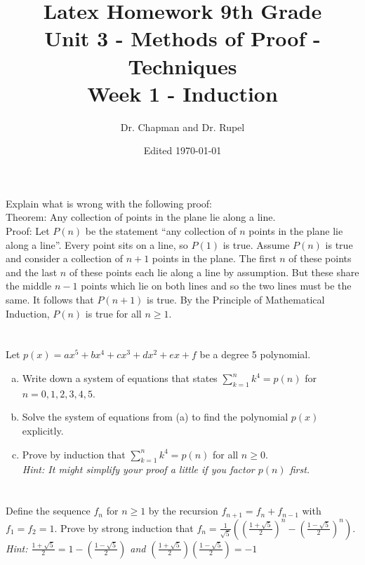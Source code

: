 \documentclass{article}
\title{Latex Homework 9th Grade\\ Unit 3 - Methods of Proof - Techniques \\ Week 1 - Induction}
\author{Dr. Chapman and Dr. Rupel}
\date{Edited \today}
\begin{document}
\maketitle

\section{}
    Explain what is wrong with the following proof:\\
    
    \noindent Theorem: Any collection of points in the plane lie along a line.\\
    
    \noindent Proof:
    Let $P(n)$ be the statement ``any collection of $n$ points in the plane lie along a line''.
    Every point sits on a line, so $P(1)$ is true.
    Assume $P(n)$ is true and consider a collection of $n+1$ points in the plane.
    The first $n$ of these points and the last $n$ of these points each lie along a line by assumption.
    But these share the middle $n-1$ points which lie on both lines and so the two lines must be the same.
    It follows that $P(n+1)$ is true.
    By the Principle of Mathematical Induction, $P(n)$ is true for all $n\ge 1$.

\section{}
    Let $p(x)=ax^5+bx^4+cx^3+dx^2+ex+f$ be a degree 5 polynomial.
    \begin{enumerate}[(a)]
        \item Write down a system of equations that states $\sum\limits_{k=1}^n k^4=p(n)$ for $n=0,1,2,3,4,5$.
        \item Solve the system of equations from (a) to find the polynomial $p(x)$ explicitly.
        \item Prove by induction that $\sum\limits_{k=1}^n k^4=p(n)$ for all $n\ge 0$.\\
        \emph{Hint: It might simplify your proof a little if you factor $p(n)$ first.}
    \end{enumerate}
    
\section{}
    Define the sequence $f_n$ for $n\ge1$ by the recursion $f_{n+1}=f_n+f_{n-1}$ with $f_1=f_2=1$.
    Prove by strong induction that $f_n=\frac{1}{\sqrt{5}}\left(\left(\frac{1+\sqrt{5}}{2}\right)^n-\left(\frac{1-\sqrt{5}}{2}\right)^n\right)$.\\
    \emph{Hint: $\frac{1+\sqrt{5}}{2}=1-\left(\frac{1-\sqrt{5}}{2}\right)$ and $\left(\frac{1+\sqrt{5}}{2}\right)\left(\frac{1-\sqrt{5}}{2}\right)=-1$}
\end{document}
